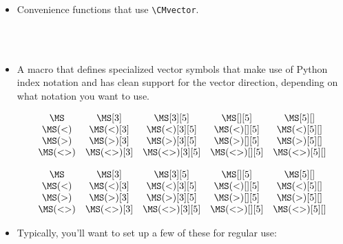 \documentclass{article}
\begin{document}
\begin{itemize}
\item Convenience functions that use \verb+\CMvector+.
\begin{LTXexample}[pos=b]
 \:  \:  \\
 \:  \:  \\
\end{LTXexample}

\item A macro that defines specialized vector symbols that make use of Python index notation
and has clean support for the vector direction, depending on what notation you want to use.
\begin{LTXexample}[pos=b]
\[\begin{matrix}
\MS     & \MS[3]     & \MS[3][5]     & \MS[][5]     & \MS[5][]     \\
\MS(<)  & \MS(<)[3]  & \MS(<)[3][5]  & \MS(<)[][5]  & \MS(<)[5][]  \\
\MS(>)  & \MS(>)[3]  & \MS(>)[3][5]  & \MS(>)[][5]  & \MS(>)[5][]  \\
\MS(<>) & \MS(<>)[3] & \MS(<>)[3][5] & \MS(<>)[][5] & \MS(<>)[5][] \\
\end{matrix}\]

\[\begin{matrix}
\MS     & \MS[3]     & \MS[3][5]     & \MS[][5]     & \MS[5][]     \\
\MS(<)  & \MS(<)[3]  & \MS(<)[3][5]  & \MS(<)[][5]  & \MS(<)[5][]  \\
\MS(>)  & \MS(>)[3]  & \MS(>)[3][5]  & \MS(>)[][5]  & \MS(>)[5][]  \\
\MS(<>) & \MS(<>)[3] & \MS(<>)[3][5] & \MS(<>)[][5] & \MS(<>)[5][] \\
\end{matrix}\]
\end{LTXexample}

\item Typically, you'll want to set up a few of these for regular use:
\begin{LTXexample}[pos=b]

\newcommand{\BiInfinity}{\MS(<>)}
\newcommand{\biinfinity}{\ms(<>)}
\newcommand{\Past}{\MS(<)}
\newcommand{\past}{\ms(<)}
\newcommand{\Future}{\MS(>)}
\newcommand{\future}{\ms(>)}


\end{LTXexample}
\end{itemize}
\end{document}
